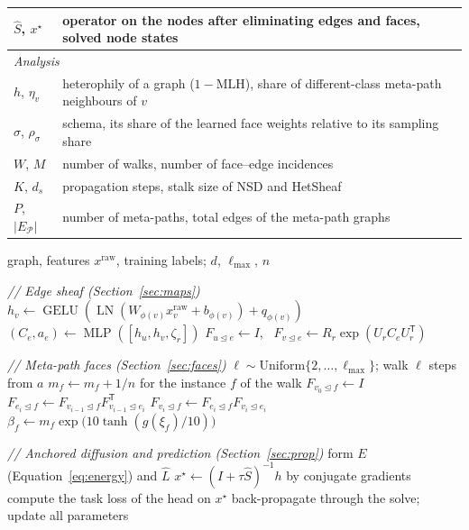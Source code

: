 \documentclass{article}
\newcommand{\method}{\textsc{H2S-NN}}
\newcommand{\transpose}{\mathsf{T}}
\newcommand{\inc}{\trianglelefteq}
\begin{document}
\begin{table}[!htbp]
\begin{tabular}{lp{}}
    $\hat S$, $x^\star$ & operator on the nodes after eliminating edges and faces, solved node states \\
    \midrule
    \multicolumn{2}{l}{\emph{Analysis}} \\
    $h$, $\eta_v$ & heterophily of a graph ($1-\mathrm{MLH}$), share of different-class meta-path neighbours of $v$ \\
    $\sigma$, $\rho_\sigma$ & schema, its share of the learned face weights relative to its sampling share \\
    $W$, $M$ & number of walks, number of face--edge incidences \\
    $K$, $d_s$ & propagation steps, stalk size of NSD and HetSheaf \\
    $P$, $|E_{\mathcal P}|$ & number of meta-paths, total edges of the meta-path graphs \\
    \bottomrule
  \end{tabular}
\end{table}

\begin{algorithm}[!htbp]
  \caption{Training of \method{}.}
  \label{alg:train}
  \small
  \begin{algorithmic}[1]
    \REQUIRE graph, features $x^{\mathrm{raw}}$, training labels; $d$, $\ell_{\max}$, $n$
      \item[] \textit{// Edge sheaf (Section~\ref{sec:maps})}
        \STATE $h_v\gets\operatorname{GELU}(\operatorname{LN}(W_{\phi(v)}x^{\mathrm{raw}}_v+b_{\phi(v)})+q_{\phi(v)})$
      \ENDFOR
        \STATE $(C_e,a_e)\gets\operatorname{MLP}([h_u,h_v,\zeta_r])$
        \STATE $F_{u\inc e}\gets I$, \ $F_{v\inc e}\gets R_r\exp(U_rC_eU_r^{\transpose})$
      \ENDFOR
      \item[] \textit{// Meta-path faces (Section~\ref{sec:faces})}
        \STATE $\ell\sim\mathrm{Uniform}\{2,\ldots,\ell_{\max}\}$; walk $\ell$ steps from $a$
        \STATE $m_f\gets m_f+1/n$ for the instance $f$ of the walk
      \ENDFOR
        \STATE $F_{v_0\inc f}\gets I$
          \STATE $F_{e_i\inc f}\gets F_{v_{i-1}\inc f}F_{v_{i-1}\inc e_i}^{\transpose}$
          \STATE $F_{v_i\inc f}\gets F_{e_i\inc f}F_{v_i\inc e_i}$
        \ENDFOR
        \STATE $\beta_f\gets m_f\exp\bigl(10\tanh(g(\xi_f)/10)\bigr)$
      \ENDFOR
      \item[] \textit{// Anchored diffusion and prediction (Section~\ref{sec:prop})}
      \STATE form $E$ (Equation~\eqref{eq:energy}) and $\hat L$
      \STATE $x^\star\gets(I+\tau\hat S)^{-1}h$ by conjugate gradients
      \STATE compute the task loss of the head on $x^\star$
      \STATE back-propagate through the solve; update all parameters
    \ENDFOR
  \end{algorithmic}
\end{algorithm}
\end{document}
